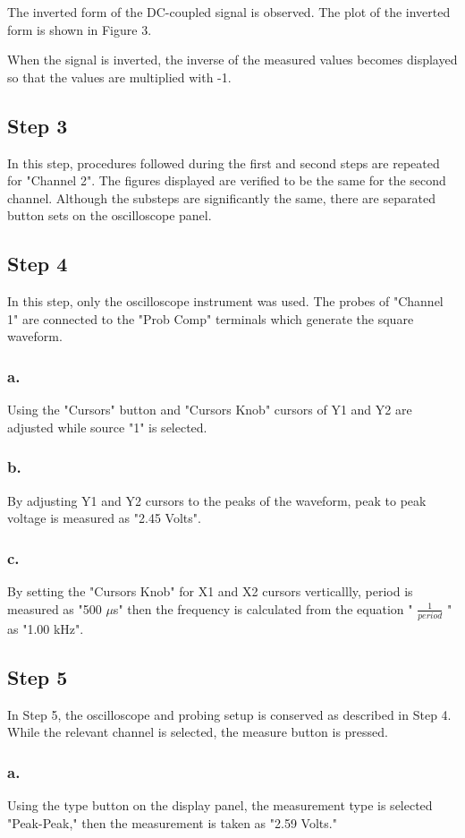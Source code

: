 \documentclass[letterpaper,12pt]{article}
\begin{document}
The inverted form of the DC-coupled signal is observed. The plot of the inverted form is shown in Figure 3.


When the signal is inverted, the inverse of the measured values becomes displayed so that the values are multiplied with -1. 

\subsection{Step 3}
In this step, procedures followed during the first and second steps are repeated for "Channel 2". The figures displayed are verified to be the same for the second channel. Although the substeps are significantly the same, there are separated button sets on the oscilloscope panel.
\subsection{Step 4}
In this step, only the oscilloscope instrument was used. The probes of "Channel 1" are connected to the "Prob Comp" terminals which generate the square waveform.
\subsubsection{a.}
Using the "Cursors" button and "Cursors Knob" cursors of Y1 and Y2 are adjusted while source "1" is selected.
\subsubsection{b.}
By adjusting Y1 and Y2 cursors to the peaks of the waveform, peak to peak voltage is measured as "2.45 Volts".
\subsubsection{c.}
By setting the "Cursors Knob" for X1 and X2 cursors verticallly, period is measured as "500 \(\mu\)s" then the frequency is calculated from the equation "  \( \frac{1}{period} \) " as "1.00 kHz".

\subsection{Step 5}
In Step 5, the oscilloscope and probing setup is conserved as described in Step 4. While the relevant channel is selected, the measure button is pressed.
\subsubsection{a.}
Using the type  button on the display panel, the measurement type is selected "Peak-Peak," then the measurement is taken as "2.59 Volts."
\end{document}

